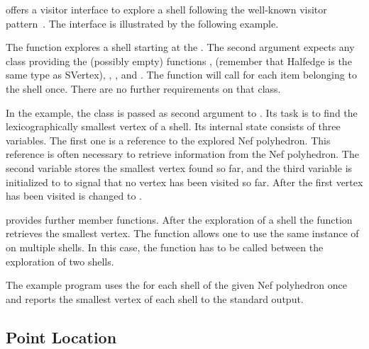  offers a visitor interface to explore a shell
following the well-known visitor pattern~\cite{cgal:ghjv-dpero-95}.
The interface is illustrated by the following example.


The function  explores a shell starting at the . The second argument
expects any class providing the (possibly empty) functions
, 
(remember that Halfedge is the same type as SVertex),
,
,
 and
.  The 
function will call  for each item belonging to the shell
once. There are no further requirements on that class.

In the example, the class  is passed as second argument
to . Its task is to find the lexicographically
smallest vertex of a shell. Its internal state consists of three variables. 
The first one is a reference to the explored Nef polyhedron. This reference
is often necessary to retrieve information from the Nef polyhedron. The
second variable  stores the smallest vertex found so far, and
the third variable  is initialized to  to signal that no
vertex has been visited so far. After the first vertex has been visited 
 is changed to .

 provides further member functions. After the
exploration of a shell the  function retrieves the
smallest vertex. The  function allows one to
use the same instance of  on multiple shells. In
this case, the  function has to be called
between the exploration of two shells.

The example program uses the  for each shell of
the given Nef polyhedron once and reports the smallest vertex of each
shell to the standard output.

\subsection{Point Location}

